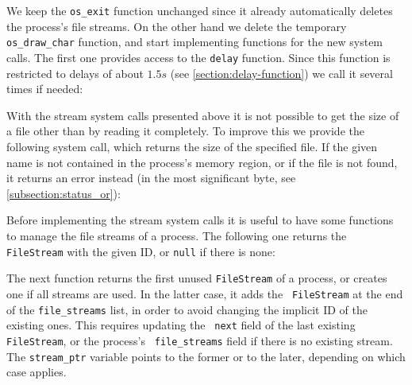 We keep the {\tt os\_exit} function unchanged since it already automatically
deletes the process's file streams. On the other hand we delete the temporary
{\tt os\_draw\_char} function, and start implementing functions for the new
system calls. The first one provides access to the {\tt delay} function. Since
this function is restricted to delays of about $1.5s$ (see
\cref{section:delay-function}) we call it several times if needed:


With the stream system calls presented above it is not possible to get the size
of a file other than by reading it completely. To improve this we provide the
following system call, which returns the size of the specified file. If the
given name is not contained in the process's memory region, or if the file is
not found, it returns an error instead (in the most significant byte, see
\cref{subsection:status_or}):


Before implementing the stream system calls it is useful to have some functions
to manage the file streams of a process. The following one returns the {\tt
FileStream} with the given ID, or {\tt null} if there is none:


The next function returns the first unused {\tt FileStream} of a process, or
creates one if all streams are used. In the latter case, it adds the {\tt
FileStream} at the end of the {\tt file\_streams} list, in order to avoid
changing the implicit ID of the existing ones. This requires updating the {\tt
next} field of the last existing {\tt FileStream}, or the process's {\tt
file\_streams} field if there is no existing stream. The {\tt stream\_ptr}
variable points to the former or to the later, depending on which case applies.


